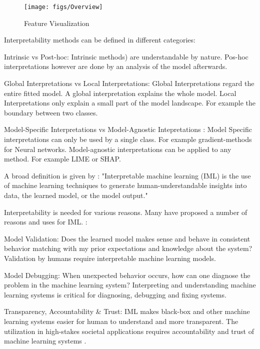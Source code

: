 \begin{figure}[h!]
	\centering
	\texttt{[image: figs/Overview]}
	\caption{Feature Visualization \cite{allen2023interpretable}}
	\label{fig:IML_Overview}
\end{figure}

Interpretability methods can be defined in different categories:

Intrinsic vs Post-hoc: Intrinsic methods) are understandable by nature. Pos-hoc interpretations however are done by an analysis of the model afterwards. 

Global Interpretations vs Local Interpretations\cite{molnar2022}: Global Interpretations regard the entire fitted model. A global interpretation explains the whole model. Local Interpretations only explain a small part of the model landscape. For example the boundary between two classes.

Model-Specific Interpretations vs Model-Agnostic Intepretations \cite{molnar2022}: 
Model Specific interpretations can only be used by a single class. For example gradient-methods for Neural networks. Model-agnostic interpretations can be applied to any method. For example LIME or SHAP.

A broad definition is given by \cite{allen2023interpretable}: "Interpretable machine learning (IML) is the use of machine learning techniques to generate human-understandable insights into data, the learned model, or the model output."

Interpretability is needed for various reasons. Many have proposed a number of reasons and uses for IML. \cite{murdoch2019definitions} \cite{Roscher2020explainable} \cite{molnar2022} \cite{guidotti2018survey} \cite{lipton2017mythos} \cite{du2019techniques} \cite{carvalho2019machine} \cite{doshivelez2017rigorous}:

Model Validation: Does the learned model makes sense and behave in consistent behavior matching with my prior expectations and knowledge about the system? Validation by humans require interpretable machine learning models.

Model Debugging: When unexpected behavior occurs, how can one diagnose the problem in the machine learning system? Interpreting and understanding machine learning systems is critical for diagnosing, debugging and fixing systems.\cite{koh2020understanding}

Transparency, Accountability \& Trust: IML makes black-box and other machine learning systems easier for human to understand and more transparent. The utilization in high-stakes societal applications requires accountability and trust of machine learning systems \cite{rudin2019stop} \cite{Samek_2019} \cite{xu2019inbook}.

